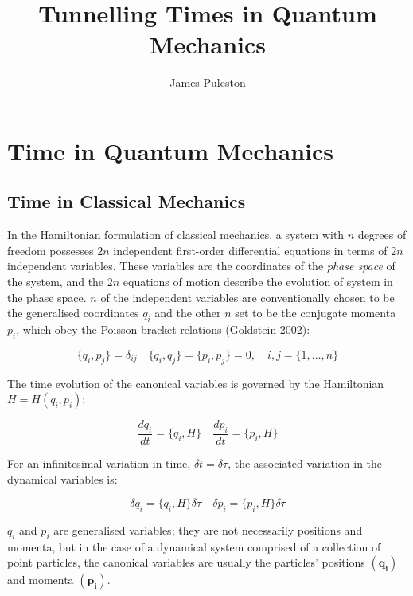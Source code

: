 \documentclass{article}
\title{Tunnelling Times in Quantum Mechanics}
\author{James Puleston}
\begin{document}
\maketitle

\section{Time in Quantum Mechanics}

\subsection{Time in Classical Mechanics}
In the Hamiltonian formulation of classical mechanics, a system with $n$ degrees of freedom possesses $2n$ independent first-order differential equations in terms of $2n$ independent variables. These variables are the coordinates of the \textit{phase space} of the system, and the $2n$ equations of motion describe the evolution of system in the phase space. $n$ of the independent variables are conventionally chosen to be the generalised coordinates $q_i$ and the other $n$ set to be the conjugate momenta $p_i$, which obey the Poisson bracket relations (Goldstein 2002):

\begin{equation}
	\{q_i, p_j\}=\delta_{ij} \quad \{q_i, q_j\}=\{p_i,p_j\}=0, \quad i,j=\{1,\dots,n\}
	\label{conjugatevars}
\end{equation}

\noindent The time evolution of the canonical variables is governed by the Hamiltonian $H = H(q_i, p_i)$:

\begin{equation}
	\frac{dq_i}{dt} = \{q_i, H\} \quad \frac{dp_i}{dt} = \{p_i, H\}
	\label{timeevolution}
\end{equation}

\noindent For an infinitesimal variation in time, $\delta t = \delta \tau$, the associated variation in the dynamical variables is:

\begin{equation}
	\delta q_i = \{q_i, H\}\delta\tau \quad \delta p_i = \{p_i, H\}\delta\tau
	\label{timetranslation}
\end{equation}

\noindent $q_i$ and $p_i$ are generalised variables; they are not necessarily positions and momenta, but in the case of a dynamical system comprised of a collection of point particles, the canonical variables are usually the particles' positions $(\boldsymbol{q_i})$ and momenta $(\boldsymbol{p_i})$. 
\end{document}
